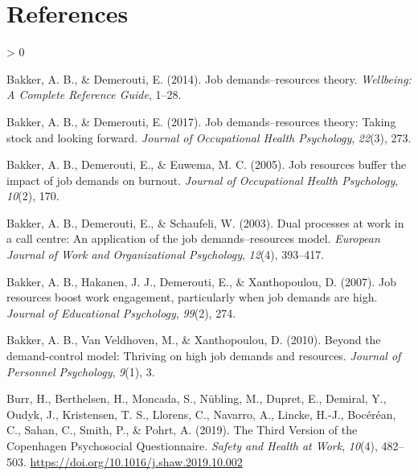 \documentclass[
  english,
  man]{apa6}
\newlength{\cslhangindent}
\newenvironment{CSLReferences}[2] %
 {%
  \setlength{\parindent}{0pt}
  \ifodd #1 \everypar{\setlength{\hangindent}{\cslhangindent}}\ignorespaces\fi
  \ifnum #2 > 0
  \setlength{\parskip}{#2\baselineskip}
  \fi
 }%
 {}
\begin{document}
\newpage

\hypertarget{references}{%
\section{References}\label{references}}

\begingroup
\setlength{\parindent}{-0.5in}
\setlength{\leftskip}{0.5in}

\hypertarget{refs}{}
\begin{CSLReferences}{1}{0}
\leavevmode\hypertarget{ref-bakker2014job}{}%
Bakker, A. B., \& Demerouti, E. (2014). Job demands--resources theory. \emph{Wellbeing: A Complete Reference Guide}, 1--28.

\leavevmode\hypertarget{ref-bakker2017job}{}%
Bakker, A. B., \& Demerouti, E. (2017). Job demands--resources theory: Taking stock and looking forward. \emph{Journal of Occupational Health Psychology}, \emph{22}(3), 273.

\leavevmode\hypertarget{ref-bakker2005job}{}%
Bakker, A. B., Demerouti, E., \& Euwema, M. C. (2005). Job resources buffer the impact of job demands on burnout. \emph{Journal of Occupational Health Psychology}, \emph{10}(2), 170.

\leavevmode\hypertarget{ref-bakker2003dual}{}%
Bakker, A. B., Demerouti, E., \& Schaufeli, W. (2003). Dual processes at work in a call centre: An application of the job demands--resources model. \emph{European Journal of Work and Organizational Psychology}, \emph{12}(4), 393--417.

\leavevmode\hypertarget{ref-bakker2007job}{}%
Bakker, A. B., Hakanen, J. J., Demerouti, E., \& Xanthopoulou, D. (2007). Job resources boost work engagement, particularly when job demands are high. \emph{Journal of Educational Psychology}, \emph{99}(2), 274.

\leavevmode\hypertarget{ref-bakker2010beyond}{}%
Bakker, A. B., Van Veldhoven, M., \& Xanthopoulou, D. (2010). Beyond the demand-control model: Thriving on high job demands and resources. \emph{Journal of Personnel Psychology}, \emph{9}(1), 3.

\leavevmode\hypertarget{ref-burr_third_2019}{}%
Burr, H., Berthelsen, H., Moncada, S., Nübling, M., Dupret, E., Demiral, Y., Oudyk, J., Kristensen, T. S., Llorens, C., Navarro, A., Lincke, H.-J., Bocéréan, C., Sahan, C., Smith, P., \& Pohrt, A. (2019). The {Third} {Version} of the {Copenhagen} {Psychosocial} {Questionnaire}. \emph{Safety and Health at Work}, \emph{10}(4), 482--503. \url{https://doi.org/10.1016/j.shaw.2019.10.002}


\end{CSLReferences}
\end{document}
